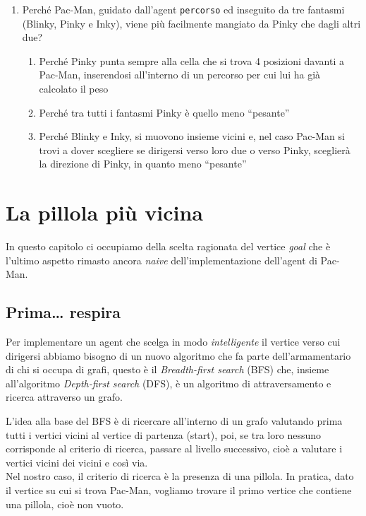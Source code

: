 \documentclass[8pt]{book}
\begin{document}
\begin{enumerate}
\item
Perché Pac-Man, guidato dall'agent \texttt{percorso} ed inseguito da tre fantasmi (Blinky, Pinky e Inky), viene più facilmente mangiato da Pinky che dagli altri due?

\begin{enumerate}
\def\labelenumi{\alph{enumi}.}
\item
  Perché Pinky punta sempre alla cella che si trova 4 posizioni davanti a Pac-Man, inserendosi all'interno di un percorso per cui lui ha già calcolato il peso
\item
  Perché tra tutti i fantasmi Pinky è quello meno ``pesante''
\item
  Perché Blinky e Inky, si muovono insieme vicini e, nel caso Pac-Man si trovi a dover scegliere se dirigersi verso loro due o verso Pinky, sceglierà la direzione di Pinky, in quanto meno ``pesante''
\end{enumerate}

\end{enumerate}


\chapter{La pillola più vicina}\label{tocux5f95}

In questo capitolo ci occupiamo della scelta ragionata del vertice \emph{goal} che è l'ultimo aspetto rimasto ancora \emph{naive} dell'implementazione dell'agent di Pac-Man.

\section{Prima\ldots{} respira}

Per implementare un agent che scelga in modo \emph{intelligente} il vertice verso cui dirigersi abbiamo bisogno di un nuovo algoritmo che fa parte dell'armamentario di chi si occupa di grafi, questo è il \emph{Breadth-first search} (BFS) che, insieme all'algoritmo \emph{Depth-first search} (DFS), è un algoritmo di attraversamento e ricerca attraverso un grafo.

L'idea alla base del BFS è di ricercare all'interno di un grafo valutando prima tutti i vertici vicini al vertice di partenza (start), poi, se tra loro nessuno corrisponde al criterio di ricerca, passare al livello successivo, cioè a valutare i vertici vicini dei vicini e così via.\\
Nel nostro caso, il criterio di ricerca è la presenza di una pillola. In pratica, dato il vertice su cui si trova Pac-Man, vogliamo trovare il primo vertice che contiene una pillola, cioè non vuoto.
\end{document}
